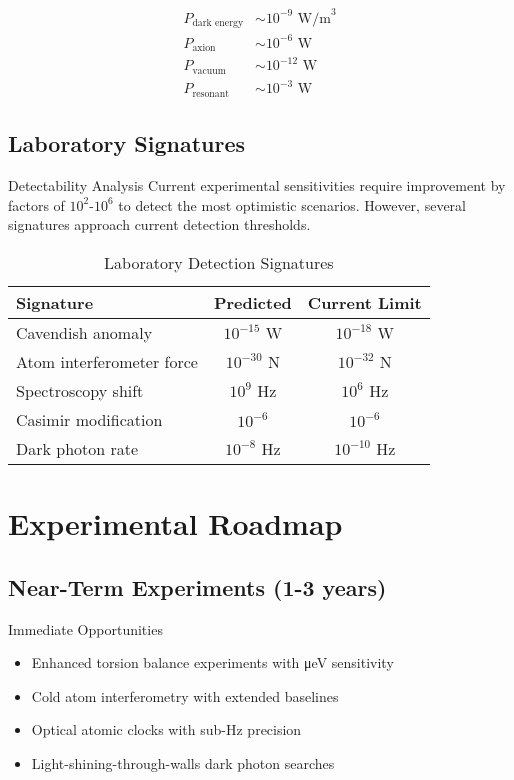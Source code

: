 \documentclass[12pt]{article}
\begin{document}
\begin{align}
P_{\text{dark energy}} &\sim 10^{-9} \text{ W/m}^3 \\
P_{\text{axion}} &\sim 10^{-6} \text{ W} \\
P_{\text{vacuum}} &\sim 10^{-12} \text{ W} \\
P_{\text{resonant}} &\sim 10^{-3} \text{ W}
\end{align}

\subsection{Laboratory Signatures}

\begin{warningbox}{Detectability Analysis}
Current experimental sensitivities require improvement by factors of $10^2$-$10^6$ to detect the most optimistic scenarios. However, several signatures approach current detection thresholds.
\end{warningbox}

\begin{table}[h]
\centering
\caption{Laboratory Detection Signatures}
\begin{tabular}{@{}lcc@{}}
\toprule
\textbf{Signature} & \textbf{Predicted} & \textbf{Current Limit} \\
\midrule
Cavendish anomaly & $10^{-15}$ W & $10^{-18}$ W \\
Atom interferometer force & $10^{-30}$ N & $10^{-32}$ N \\
Spectroscopy shift & $10^{9}$ Hz & $10^{6}$ Hz \\
Casimir modification & $10^{-6}$ & $10^{-6}$ \\
Dark photon rate & $10^{-8}$ Hz & $10^{-10}$ Hz \\
\bottomrule
\end{tabular}
\end{table}

\section{Experimental Roadmap}

\subsection{Near-Term Experiments (1-3 years)}

\begin{successbox}{Immediate Opportunities}
\begin{itemize}
\item Enhanced torsion balance experiments with μeV sensitivity
\item Cold atom interferometry with extended baselines
\item Optical atomic clocks with sub-Hz precision
\item Light-shining-through-walls dark photon searches
\end{itemize}
\end{successbox}
\end{document}
